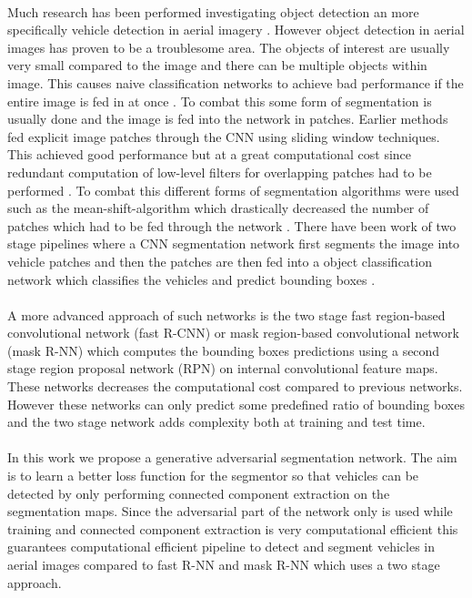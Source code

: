\documentclass{kththesis}
\begin{document}
\\
Much research has been performed investigating object detection an more specifically vehicle detection in aerial imagery \parencite{ammour_deep_2017, holt_object-based_2009, audebert_segment-before-detect:_2017, razakarivony_vehicle_2015, zhong_robust_2017, audebert_usability_2016, sakla_deep_2017}. However object detection in aerial images has proven to be a troublesome area. The objects of interest are usually very small compared to the image and there can be multiple objects within image. This causes naive classification networks to achieve bad performance if the entire image is fed in at once \parencite{ammour_deep_2017}. To combat this some form of segmentation is usually done and the image is fed into the network in patches. Earlier methods fed explicit image patches through the CNN using sliding window techniques\parencite{holt_object-based_2009}. This achieved good performance but at a great computational cost since redundant computation of low-level filters for overlapping patches had to be performed \parencite{luc_semantic_2016}. To combat this different forms of segmentation algorithms were used such as the mean-shift-algorithm which drastically decreased the number of patches which had to be fed through the network \parencite{ammour_deep_2017}. There have been work of two stage pipelines where a CNN segmentation network first segments the image into vehicle patches and then the patches are then fed into a object classification network which classifies the vehicles and predict bounding boxes \parencite{audebert_segment-before-detect:_2017}.\\
\\
A more advanced approach of such networks is the two stage fast region-based convolutional network (fast R-CNN) \parencite{ren_faster_2015, girshick_fast_2015} or mask region-based convolutional network (mask R-NN) \parencite{he_mask_2017} which computes the bounding boxes predictions using a second stage region proposal network (RPN) on internal convolutional feature maps. These networks decreases the computational cost compared to previous networks.  However these networks can only predict some predefined ratio of bounding boxes and the two stage network adds complexity both at training and test time.\\
\\
In this work we propose a generative adversarial segmentation network. The aim is to learn a better loss function for the segmentor so that vehicles can be detected by only performing connected component extraction on the segmentation maps. Since the adversarial part of the network only is used while training and connected component extraction is very computational efficient this guarantees computational efficient pipeline to detect and segment vehicles in aerial images compared to fast R-NN and mask R-NN which uses a two stage approach.
\end{document}
